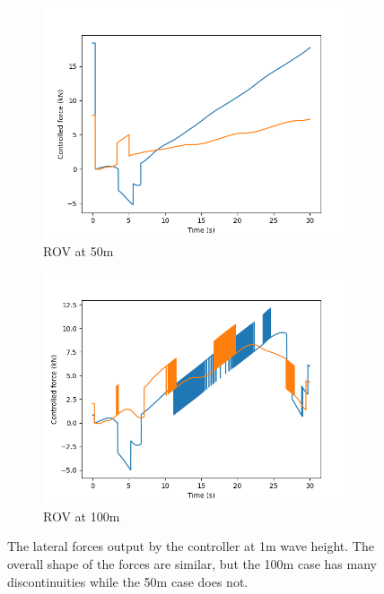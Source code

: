 \documentclass[class=article, crop=false]{standalone}
\begin{document}
\begin{figure}
    \centering
    \begin{subfigure}{0.45\textwidth}
        \centering
        \includegraphics{scenario1/rov-50m/1.0m/usv_forces}
        \caption{ROV at 50m}
    \end{subfigure}
    \hfill
        \begin{subfigure}{0.45\textwidth}
        \centering
        \includegraphics{scenario1/rov-100m/1.0m/usv_forces}
        \caption{ROV at 100m}
    \end{subfigure}
    \caption{The lateral forces output by the controller at 1m wave height. The overall shape of the forces are similar, but the 100m case has many discontinuities while the 50m case does not.}
    \label{fig:compare_forces}
\end{figure}
\end{document}
